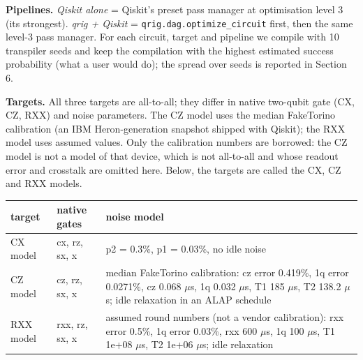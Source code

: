 \documentclass[
  10pt,
]{article}
\newcounter{none} %
\begin{document}
\textbf{Pipelines.} \emph{Qiskit alone} = Qiskit's preset pass manager
at optimisation level 3 (its strongest). \emph{qrig + Qiskit} =
\texttt{qrig.dag.optimize\_circuit} first, then the same level-3 pass
manager. For each circuit, target and pipeline we compile with 10
transpiler seeds and keep the compilation with the highest estimated
success probability (what a user would do); the spread over seeds is
reported in Section 6.

\textbf{Targets.} All three targets are all-to-all; they differ in
native two-qubit gate (CX, CZ, RXX) and noise parameters. The CZ model
uses the median FakeTorino calibration (an IBM Heron-generation snapshot
shipped with Qiskit); the RXX model uses assumed values. Only the
calibration numbers are borrowed: the CZ model is not a model of that
device, which is not all-to-all and whose readout error and crosstalk
are omitted here. Below, the targets are called the CX, CZ and RXX
models.

{\def\LTcaptype{none} %
\begin{longtable}[]{@{}
  >{\raggedright\arraybackslash}p{}
  >{\raggedright\arraybackslash}p{}
  >{\raggedright\arraybackslash}p{}@{}}
\toprule\noalign{}
\begin{minipage}[b]{\linewidth}\raggedright
target
\end{minipage} & \begin{minipage}[b]{\linewidth}\raggedright
native gates
\end{minipage} & \begin{minipage}[b]{\linewidth}\raggedright
noise model
\end{minipage} \\
\midrule\noalign{}
\endhead
\bottomrule\noalign{}
\endlastfoot
CX model & cx, rz, sx, x & p2 = 0.3\%, p1 = 0.03\%, no idle noise \\
CZ model & cz, rz, sx, x & median FakeTorino calibration: cz error
0.419\%, 1q error 0.0271\%, cz 0.068 \ensuremath{\mu}s, 1q 0.032 \ensuremath{\mu}s, T1 185 \ensuremath{\mu}s, T2
138.2 \ensuremath{\mu}s; idle relaxation in an ALAP schedule \\
RXX model & rxx, rz, sx, x & assumed round numbers (not a vendor
calibration): rxx error 0.5\%, 1q error 0.03\%, rxx 600 \ensuremath{\mu}s, 1q 100 \ensuremath{\mu}s,
T1 1e+08 \ensuremath{\mu}s, T2 1e+06 \ensuremath{\mu}s; idle relaxation \\
\end{longtable}
}
\end{document}
